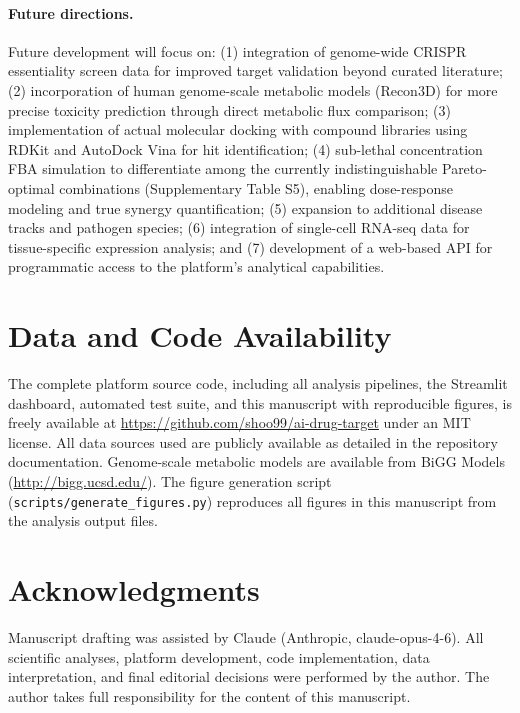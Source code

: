 \documentclass[12pt,a4paper]{article}
\begin{document}
\paragraph{Future directions.}
Future development will focus on: (1) integration of genome-wide CRISPR essentiality screen data for improved target validation beyond curated literature; (2) incorporation of human genome-scale metabolic models (Recon3D) for more precise toxicity prediction through direct metabolic flux comparison; (3) implementation of actual molecular docking with compound libraries using RDKit and AutoDock Vina for hit identification; (4) sub-lethal concentration FBA simulation to differentiate among the currently indistinguishable Pareto-optimal combinations (Supplementary Table S5), enabling dose-response modeling and true synergy quantification; (5) expansion to additional disease tracks and pathogen species; (6) integration of single-cell RNA-seq data for tissue-specific expression analysis; and (7) development of a web-based API for programmatic access to the platform's analytical capabilities.

\section{Data and Code Availability}

The complete platform source code, including all analysis pipelines, the Streamlit dashboard, automated test suite, and this manuscript with reproducible figures, is freely available at \url{https://github.com/shoo99/ai-drug-target} under an MIT license. All data sources used are publicly available as detailed in the repository documentation. Genome-scale metabolic models are available from BiGG Models (\url{http://bigg.ucsd.edu/}). The figure generation script (\texttt{scripts/generate\_figures.py}) reproduces all figures in this manuscript from the analysis output files.

\section*{Acknowledgments}

Manuscript drafting was assisted by Claude (Anthropic, claude-opus-4-6). All scientific analyses, platform development, code implementation, data interpretation, and final editorial decisions were performed by the author. The author takes full responsibility for the content of this manuscript.
\end{document}
